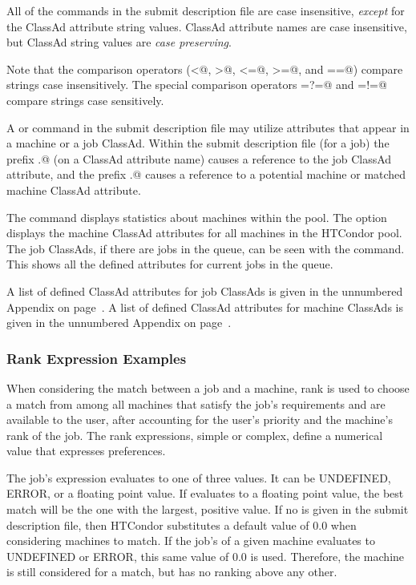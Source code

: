 All of the commands in the submit description file are case insensitive, 
\emph{except} for the ClassAd attribute string values.
ClassAd attribute names are
case insensitive, but ClassAd string
values are \emph{case preserving}.

Note that the comparison operators
(\verb@<@, \verb@>@, \verb@<=@, \verb@>=@, and \verb@==@)
compare strings
case insensitively.  The special comparison operators 
\verb@=?=@ and \verb@=!=@
compare strings case sensitively.

A   or  command in
the submit description file may utilize attributes
that appear in a machine or a job ClassAd.
Within the submit description file (for a job) the
prefix \verb@MY.@ (on a ClassAd attribute name)
causes a reference to the job ClassAd attribute,
and the prefix \verb@TARGET.@ causes a reference to 
a potential machine or matched machine ClassAd attribute.

The  command displays
statistics about machines within the pool.
The  option displays the
machine ClassAd attributes for all machines in the HTCondor pool.
The job ClassAds, if there are jobs in the queue, can be seen
with the  command.
This shows all the defined attributes for current jobs in the queue.

A list of defined ClassAd attributes for job ClassAds
is given in the unnumbered Appendix on 
page~\pageref{sec:Job-ClassAd-Attributes}.
A list of defined ClassAd attributes for machine ClassAds
is given in the unnumbered Appendix on 
page~\pageref{sec:Machine-ClassAd-Attributes}.


\subsubsection{\label{rank-examples}Rank Expression Examples}

When considering the match between a job and a machine, rank is used
to choose a match from among all machines that satisfy the job's
requirements and are available to the user, after accounting for
the user's priority and the machine's rank of the job.
The rank expressions, simple or complex, define a numerical value
that expresses preferences.

The job's  expression evaluates to one of three values.
It can be UNDEFINED, ERROR, or a floating point value.
If  evaluates to a floating point value,
the best match will be the one with the largest, positive value.
If no  is given 
in the submit description file,
then HTCondor substitutes a default value of 0.0 when considering
machines to match.
If the job's  of a given machine evaluates
to UNDEFINED or ERROR,
this same value of 0.0 is used.
Therefore, the machine is still considered for a match,
but has no ranking above any other.

